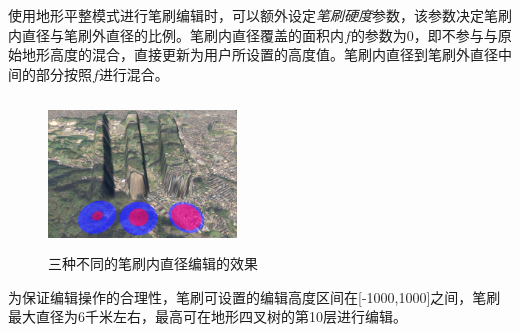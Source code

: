 使用地形平整模式进行笔刷编辑时，可以额外设定\textit{笔刷硬度}参数，该参数决定笔刷内直径与笔刷外直径的比例。笔刷内直径覆盖的面积内$f$的参数为0，即不参与与原始地形高度的混合，直接更新为用户所设置的高度值。笔刷内直径到笔刷外直径中间的部分按照$f$进行混合。\par
\begin{figure}[ht]
\centering
\includegraphics[height=4cm        ,width=5cm]{figures/flatten2.jpg}
\caption{三种不同的笔刷内直径编辑的效果}
\end{figure}
为保证编辑操作的合理性，笔刷可设置的编辑高度区间在[-1000,1000]之间，笔刷最大直径为6千米左右，最高可在地形四叉树的第10层进行编辑。
